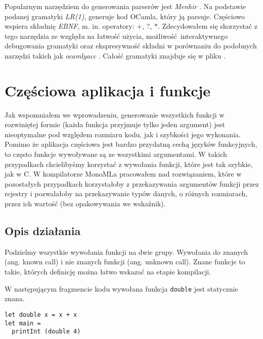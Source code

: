 \documentclass[declaration,shortabstract]{iithesis}
\begin{document}
Popularnym narzędziem do generowania parserów jest \textit{Menhir} 
\cite{menhir}. Na podstawie podanej gramatyki \textit{LR(1)}, generuje kod OCamla, 
który ją parsuje. Częściowo wspiera składnię \textit{EBNF}, m. in. operatory: $
+$, $?$, $\ast$. Zdecydowałem się skorzystać z tego narzędzia ze względu na 
łatwość użycia, możliwość interaktywnego debugowania gramatyki oraz 
ekspresywność składni w porównaniu do podobnych narzędzi takich jak \textit
{ocamlyacc} \cite{menhir}. Całość gramatyki znajduje się w pliku \newline
{}. 

\section{Częściowa aplikacja i funkcje}

Jak wspomniałem we wprowadzeniu, generowanie wszystkich funkcji w rozwiniętej 
formie (każda funkcja przyjmuje tylko jeden argument) jest nieoptymalne pod
względem rozmiaru kodu, jak i szybkości jego wykonania. Pomimo że aplikacja 
częściowa jest bardzo przydatną cechą języków funkcyjnych, to często funkcje
wywoływane są ze wszystkimi argumentami. W takich przypadkach chcielibyśmy 
korzystać z wywołania funkcji, które jest tak szybkie, jak w C. 
W kompilatorze MonoMLa pracowałem nad rozwiązaniem, które w pozostałych 
przypadkach korzystałoby z przekazywania argumentów funkcji przez rejestry i 
pozwalałoby na przekazywanie typów danych, o różnych rozmiarach, przez ich 
wartość (bez opakowywania we wskaźnik). 

\subsection{Opis działania}

Podzielmy wszystkie wywołania funkcji na dwie grupy. Wywołania do znanych 
(ang. known call) i nie znanych funkcji (ang. unknown call). Znane funkcje to 
takie, których definicję można łatwo wskazać na etapie kompilacji. 

W następującym fragmencie kodu wywołana funkcja \texttt{double} jest 
statycznie znana.

\begin{lstlisting}[frame=lines] 
let double x = x + x
let main = 
  printInt (double 4)
\end{lstlisting}
\end{document}
